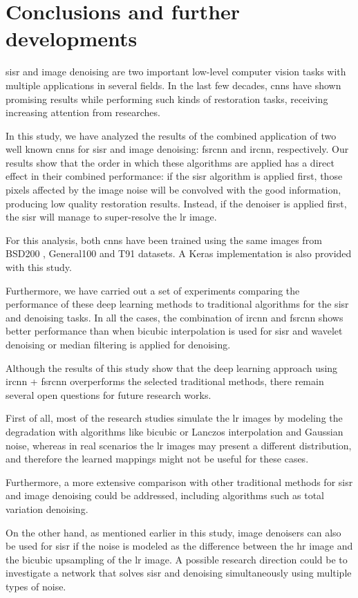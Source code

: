 \section{Conclusions and further developments} \label{sec:conclusions}

\gls{sisr} and image denoising are two important low-level computer vision tasks with multiple applications in several fields. In the last few decades, \glspl{cnn} have shown promising results while performing such kinds of restoration tasks, receiving increasing attention from researches.

In this study, we have analyzed the results of the combined application of two well known \glspl{cnn} for \gls{sisr} and image denoising: \gls{fsrcnn} and \gls{ircnn}, respectively.
Our results show that the order in which these algorithms are applied has a direct effect in their combined performance: if the \gls{sisr} algorithm is applied first, those pixels affected by the image noise will be convolved with the good information, producing low quality restoration results. Instead, if the denoiser is applied first, the \gls{sisr} will manage to super-resolve the \gls{lr} image.

For this analysis, both \glspl{cnn} have been trained using the same images from BSD200 \cite{BSDS}, General100 \cite{FSRCNN} and T91 \cite{T91} datasets. A Keras \cite{KERAS} implementation is also provided with this study.

Furthermore, we have carried out a set of experiments comparing the performance of these deep learning methods to traditional algorithms for the \gls{sisr} and denoising tasks. In all the cases, the combination of \gls{ircnn} and \gls{fsrcnn} shows better performance than when bicubic interpolation is used for \gls{sisr} and wavelet denoising or median filtering is applied for denoising.

Although the results of this study show that the deep learning approach using \gls{ircnn} + \gls{fsrcnn} overperforms the selected traditional methods, there remain several open questions for future research works.

First of all, most of the research studies simulate the \gls{lr} images by modeling the degradation with algorithms like bicubic or Lanczos interpolation and Gaussian noise, whereas in real scenarios the \gls{lr} images may present a different distribution, and therefore the learned mappings might not be useful for these cases.

Furthermore, a more extensive comparison with other traditional methods for \gls{sisr} and image denoising could be addressed, including algorithms such as total variation denoising.

On the other hand, as mentioned earlier in this study, image denoisers can also be used for \gls{sisr} if the noise is modeled as the difference between the \gls{hr} image and the bicubic upsampling
of the \gls{lr} image. A possible research direction could be to investigate a network that solves \gls{sisr} and denoising simultaneously using multiple types of noise.
